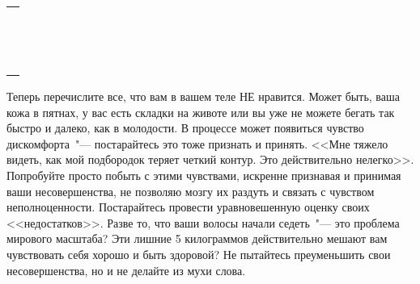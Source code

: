 \setlength{\extrarowheight}{2mm}
\begin{tabularx}{0.96\textwidth}{X}
	\\
	\arrayrulecolor{gray}\hline\\
	\hline\\
	\hline\\
	\hline\\
	\hline\\
	\hline\\	
	\hline\\
	\hline\\
	\hline\\
	\hline\\
	\hline\\
	\hline\\
	\hline\\
	\hline\\
	\hline\\
\end{tabularx}
\setlength{\extrarowheight}{0mm}
\begin{itemize}
	\itemWritingHand Теперь перечислите все, что вам в вашем теле НЕ нравится. Может быть, ваша кожа в пятнах, у вас есть складки на животе или вы уже не можете бегать так быстро и далеко, как в молодости. В процессе может появиться чувство дискомфорта~"--- постарайтесь это тоже признать и принять. <<Мне тяжело видеть, как мой подбородок теряет четкий контур. Это действительно нелегко>>. Попробуйте просто побыть с этими чувствами, искренне признавая и принимая ваши несовершенства, не позволяю мозгу их раздуть и связать с чувством неполноценности. Постарайтесь провести уравновешенную оценку своих <<недостатков>>. Разве то, что ваши волосы начали седеть~"--- это проблема мирового масштаба? Эти лишние 5 килограммов действительно мешают вам чувствовать себя хорошо и быть здоровой? Не пытайтесь преуменьшить свои несовершенства, но и не делайте из мухи слова. 
\end{itemize}

